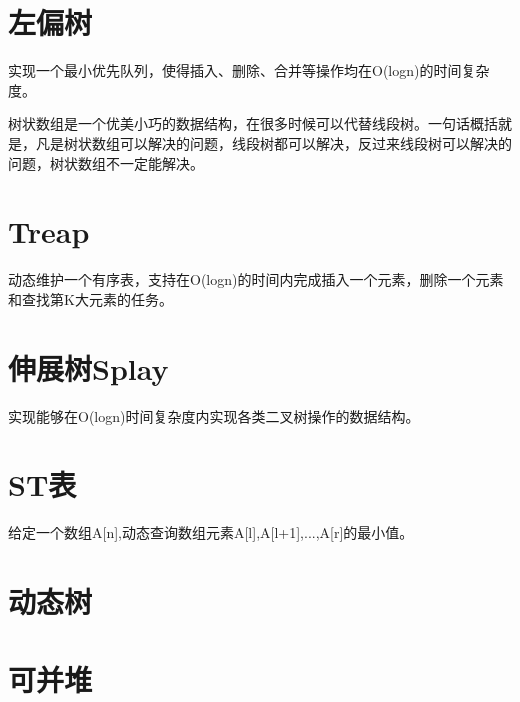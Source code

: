 \section{左偏树}
实现一个最小优先队列，使得插入、删除、合并等操作均在O(logn)的时间复杂度。

树状数组是一个优美小巧的数据结构，在很多时候可以代替线段树。一句话概括就是，凡是树状数组可以解决的问题，线段树都可以解决，反过来线段树可以解决的问题，树状数组不一定能解决。

\section{Treap}
动态维护一个有序表，支持在O(logn)的时间内完成插入一个元素，删除一个元素和查找第K大元素的任务。

\section{伸展树Splay}
实现能够在O(logn)时间复杂度内实现各类二叉树操作的数据结构。

\section{ST表}
给定一个数组A[n],动态查询数组元素A[l],A[l+1],...,A[r]的最小值。
\section{动态树}

\section{可并堆}